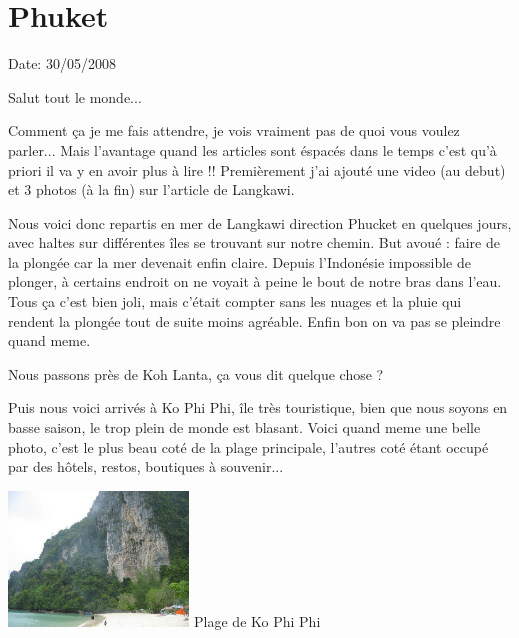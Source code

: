 \section{Phuket}

Date: 30/05/2008

\begin{multicols}{2}

Salut tout le monde...

Comment ça je me fais attendre, je vois vraiment pas de quoi vous voulez parler... Mais l'avantage quand les articles sont éspacés dans le temps c'est qu'à priori il va y en avoir plus à lire !! Premièrement j'ai ajouté une video (au debut) et 3 photos (à la fin) sur l'article de Langkawi.

Nous voici donc repartis en mer de Langkawi direction Phucket en quelques jours, avec haltes sur différentes îles se trouvant sur notre chemin. But avoué : faire de la plongée car la mer devenait enfin claire. Depuis l'Indonésie impossible de plonger, à certains endroit on ne voyait à peine le bout de notre bras dans l'eau. Tous ça c'est bien joli, mais c'était compter sans les nuages et la pluie qui rendent la plongée tout de suite moins agréable. Enfin bon on va pas se pleindre quand meme.

Nous passons près de Koh Lanta, ça vous dit quelque chose ?


Puis nous voici arrivés à Ko Phi Phi, île très touristique, bien que nous soyons en basse saison, le trop plein de monde est blasant. Voici quand meme une belle photo, c'est le plus beau coté de la plage principale, l'autres coté étant occupé par des hôtels, restos, boutiques à souvenir...

\hspace*{-0.65cm}
\includegraphics[width=4.8cm]{articles/Phucket/12121623747QwQ.jpg}
Plage de Ko Phi Phi


\end{multicols}
